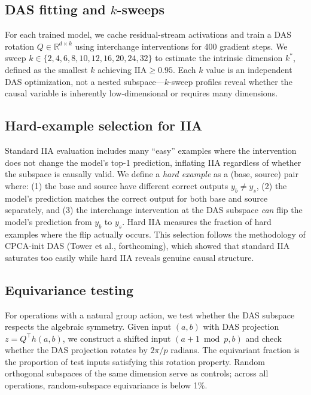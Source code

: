 \documentclass{article}
\newcommand{\IIA}{\mathrm{IIA}}
\newcommand{\R}{\mathbb{R}}
\begin{document}
\subsection{DAS fitting and $k$-sweeps}

For each trained model, we cache residual-stream activations and train a DAS
rotation $Q \in \R^{d \times k}$ using interchange interventions for 400
gradient steps. We sweep $k \in \{2, 4, 6, 8, 10, 12, 16, 20, 24, 32\}$ to
estimate the intrinsic dimension $k^*$, defined as the smallest $k$ achieving
$\IIA \geq 0.95$. Each $k$ value is an independent DAS optimization, not a
nested subspace---$k$-sweep profiles reveal whether the causal variable is
inherently low-dimensional or requires many dimensions.

\subsection{Hard-example selection for IIA}
\label{sec:hard_examples}

Standard IIA evaluation includes many ``easy'' examples where the intervention
does not change the model's top-1 prediction, inflating IIA regardless of whether
the subspace is causally valid. We define a \emph{hard example} as a
(base, source) pair where: (1) the base and source have different correct outputs
$y_b \neq y_s$, (2) the model's prediction matches the correct output for both
base and source separately, and (3) the interchange intervention at the DAS
subspace \emph{can} flip the model's prediction from $y_b$ to $y_s$. Hard IIA
measures the fraction of hard examples where the flip actually occurs. This
selection follows the methodology of CPCA-init DAS
(Tower et al., forthcoming), which showed that standard IIA saturates too easily
while hard IIA reveals genuine causal structure.

\subsection{Equivariance testing}

For operations with a natural group action, we test whether the DAS subspace
respects the algebraic symmetry. Given input $(a, b)$ with DAS projection
$z = Q^\top h(a,b)$, we construct a shifted input $(a{+}1 \bmod p, b)$ and
check whether the DAS projection rotates by $2\pi/p$ radians. The equivariant
fraction is the proportion of test inputs satisfying this rotation property.
Random orthogonal subspaces of the same dimension serve as controls; across all
operations, random-subspace equivariance is below 1\%.
\end{document}
